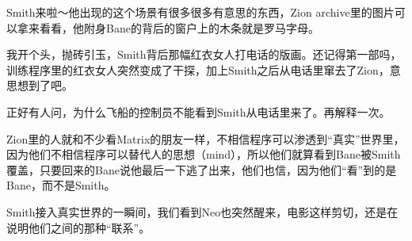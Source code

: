 \documentclass{ctexart}
\begin{document}
Smith来啦～他出现的这个场景有很多很多有意思的东西，Zion archive里的图片可以拿来看看，他附身Bane的背后的窗户上的木条就是罗马字母。

我开个头，抛砖引玉，Smith背后那幅红衣女人打电话的版画。还记得第一部吗，训练程序里的红衣女人突然变成了干探，加上Smith之后从电话里窜去了Zion，意思想到了吧。

正好有人问，为什么飞船的控制员不能看到Smith从电话里来了。再解释一次。

Zion里的人就和不少看Matrix的朋友一样，不相信程序可以渗透到“真实”世界里，因为他们不相信程序可以替代人的思想（mind），所以他们就算看到Bane被Smith覆盖，只要回来的Bane说他最后一下逃了出来，他们也信，因为他们“看”到的是Bane，而不是Smith。

Smith接入真实世界的一瞬间，我们看到Neo也突然醒来，电影这样剪切，还是在说明他们之间的那种“联系”。
\end{document}
